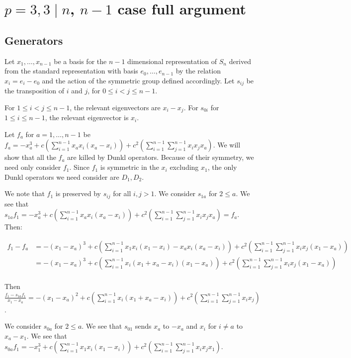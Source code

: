 \documentclass{article}
\numberwithin{equation}{section}
\begin{document}
\section{$p=3, 3 \mid n$, $n-1$ case full argument}

\subsection{Generators}

Let $x_1,\dots,x_{n-1}$ be a basis for the $n-1$ dimensional representation of $S_n$ derived from the standard representation with basis $e_0,\dots,e_{n-1}$ by the relation $x_i=e_i-e_0$ and the action of the symmetric group defined accordingly. Let $s_{ij}$ be the transposition of $i$ and $j$, for $0 \le i < j \le n-1$. 

For $1 \le i < j \le n-1$, the relevant eigenvectors are $x_i-x_j$. For $s_{0i}$ for $1 \le i \le n-1$, the relevant eigenvector is $x_i$. 

Let $f_a$ for $a=1,\dots, n-1$ be $f_a = -x_a^3+c \left(\sum_{i=1}^{n-1} x_ax_i(x_a-x_i)\right)+c^2 \left(\sum_{i=1}^{n-1} \sum_{j=1}^{n-1} x_ix_jx_a\right)$. We will show that all the $f_a$ are killed by Dunkl operators. Because of their symmetry, we need only consider $f_1$. Since $f_1$ is symmetric in the $x_i$ excluding $x_1$, the only Dunkl operators we need consider are $D_1,D_2$.

We note that $f_1$ is preserved by $s_{ij}$ for all $i,j >1$. We consider $s_{1a}$ for $2 \le a$. We see that $s_{1a}f_1=-x_a^3+c \left(\sum_{i=1}^{n-1} x_ax_i(x_a-x_i)\right)+c^2 \left(\sum_{i=1}^{n-1} \sum_{j=1}^{n-1} x_ix_jx_a\right)=f_a$. Then:

\begin{align*}
f_1-f_a&=-(x_1-x_a)^3+c \left(\sum_{i=1}^{n-1} x_1x_i(x_1-x_i)-x_ax_i(x_a-x_i)\right)+c^2 \left(\sum_{i=1}^{n-1} \sum_{j=1}^{n-1} x_ix_j(x_1-x_a)\right)\\
&=-(x_1-x_a)^3+c \left(\sum_{i=1}^{n-1} x_i(x_1+x_a-x_i)(x_1-x_a)\right)+c^2 \left(\sum_{i=1}^{n-1} \sum_{j=1}^{n-1} x_ix_j(x_1-x_a)\right)\\
\end{align*}

Then $\frac{f_1-s_{1a}f_1}{x_1-x_a}=-(x_1-x_a)^2+c \left(\sum_{i=1}^{n-1} x_i(x_1+x_a-x_i)\right)+c^2 \left(\sum_{i=1}^{n-1} \sum_{j=1}^{n-1} x_ix_j\right)$.

We consider $s_{0a}$ for $2 \le a$. We see that $s_{01}$ sends $x_a$ to $-x_a$ and $x_i$ for $i \ne a$ to $x_a-x_1$. We see that $s_{0a}f_1=-x_1^3+c \left(\sum_{i=1}^{n-1} x_1x_i(x_1-x_i)\right)+c^2 \left(\sum_{i=1}^{n-1} \sum_{j=1}^{n-1} x_ix_jx_1\right)$. %
\end{document}
